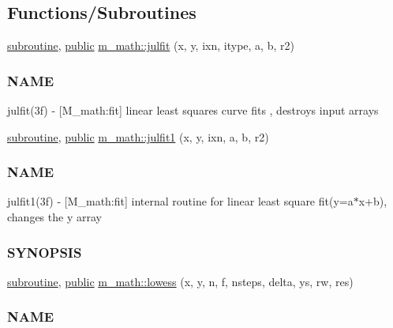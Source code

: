 \subsection*{Functions/\+Subroutines}
\begin{DoxyCompactItemize}
\item 
\hyperlink{M__stopwatch_83_8txt_acfbcff50169d691ff02d4a123ed70482}{subroutine}, \hyperlink{M__stopwatch_83_8txt_a2f74811300c361e53b430611a7d1769f}{public} \hyperlink{namespacem__math_ae78c38ba0be037a58cace0da51c7a8ca}{m\+\_\+math\+::julfit} (x, y, ixn, itype, a, b, r2)
\begin{DoxyCompactList}\small\item\em \subsubsection*{N\+A\+ME}

julfit(3f) -\/ \mbox{[}M\+\_\+math\+:fit\mbox{]} linear least squares curve fits , destroys input arrays \end{DoxyCompactList}\item 
\hyperlink{M__stopwatch_83_8txt_acfbcff50169d691ff02d4a123ed70482}{subroutine}, \hyperlink{M__stopwatch_83_8txt_a2f74811300c361e53b430611a7d1769f}{public} \hyperlink{namespacem__math_a9a1a7478c87dda7eb126127970f70b7b}{m\+\_\+math\+::julfit1} (x, y, ixn, a, b, r2)
\begin{DoxyCompactList}\small\item\em \subsubsection*{N\+A\+ME}

julfit1(3f) -\/ \mbox{[}M\+\_\+math\+:fit\mbox{]} internal routine for linear least square fit(y=a$\ast$x+b), changes the y array \subsubsection*{S\+Y\+N\+O\+P\+S\+IS}\end{DoxyCompactList}\item 
\hyperlink{M__stopwatch_83_8txt_acfbcff50169d691ff02d4a123ed70482}{subroutine}, \hyperlink{M__stopwatch_83_8txt_a2f74811300c361e53b430611a7d1769f}{public} \hyperlink{namespacem__math_a8e38b0954bb4c1f27985fb430912f281}{m\+\_\+math\+::lowess} (x, y, n, f, nsteps, delta, ys, rw, res)
\begin{DoxyCompactList}\small\item\em \subsubsection*{N\+A\+ME}


\end{DoxyCompactList}
\end{DoxyCompactItemize}
